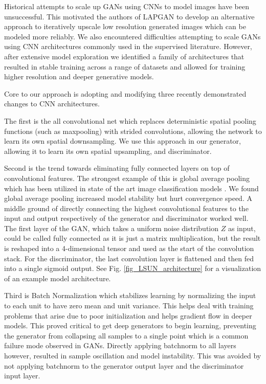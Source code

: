 \documentclass{article} %
\begin{document}
Historical attempts to scale up GANs using CNNs to model images have been unsuccessful. This motivated the authors of LAPGAN \citep{denton2015deep} to develop an alternative approach to iteratively upscale low resolution generated images which can be modeled more reliably. We also encountered difficulties attempting to scale GANs using CNN architectures commonly used in the supervised literature. However, after extensive model exploration we identified a family of architectures that resulted in stable training across a range of datasets and allowed for training higher resolution and deeper generative models.

Core to our approach is adopting and modifying three recently demonstrated changes to CNN architectures. 

The first is the all convolutional net \citep{springenberg2014striving} which replaces deterministic spatial pooling functions (such as maxpooling) with strided convolutions, allowing the network to learn its own spatial downsampling. We use this approach in our generator, allowing it to learn its own spatial upsampling, and discriminator.

Second is the trend towards eliminating fully connected layers on top of convolutional features. The strongest example of this is global average pooling which has been utilized in state of the art image classification models \citep{Inceptionism2015}. We found global average pooling increased model stability but hurt convergence speed. A middle ground of directly connecting the highest convolutional features to the input and output respectively of the generator and discriminator worked well. The first layer of the GAN, which takes a uniform noise distribution $Z$ as input, could be called fully connected as it is just a matrix multiplication, but the result is reshaped into a 4-dimensional tensor and used as the start of the convolution stack. For the discriminator, the last convolution layer is flattened and then fed into a single sigmoid output. See Fig. \ref{fig_LSUN_architecture} for a visualization of an example model architecture.

Third is Batch Normalization \citep{ioffe2015batch} which stabilizes learning by normalizing the input to each unit to have zero mean and unit variance. This helps deal with training problems that arise due to poor initialization and helps gradient flow in deeper models. This proved critical to get deep generators to begin learning, preventing the generator from collapsing all samples to a single point which is a common failure mode observed in GANs. Directly applying batchnorm to all layers however, resulted in sample oscillation and model instability. This was avoided by not applying batchnorm to the generator output layer and the discriminator input layer.
\end{document}
